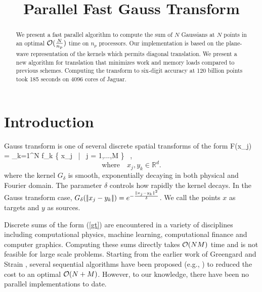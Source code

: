 \documentclass[conference]{IEEEtran}
\begin{document}
\title{Parallel Fast Gauss Transform}  


\author{

\and
{}

\and
{}
}
\date{}
\maketitle

\begin{abstract}
We present a fast parallel algorithm to compute the sum of $N$ Gaussians at $N$ points in an optimal $\mathcal{O}(\frac{N}{n_p})$ time on $n_p$ processors. Our implementation is based on the plane-wave representation of the kernels which permits diagonal translation. We present a new algorithm for translation that minimizes work and memory loads compared to previous schemes.
Computing the transform to six-digit accuracy at 120 billion points took 185 seconds on 4096 cores of Jaguar. 
\end{abstract}

\section{Introduction}  \label{s:intro}
Gauss transform is one of several discrete spatial transforms of the form 
%
\beq F(x_j) = \sum_{k=1}^N  f_k \quad {} \quad \{ x_j \, | \, j = 1,...,M \} \, , \label{gt} \eeq
\[\text{where} \quad x_j, y_k \in \mathbb{R}^d. \]
%
where the kernel $G_\delta$ is smooth, exponentially decaying in both physical and Fourier domain. The parameter $\delta$ controls how rapidly the kernel decays.  
In the Gauss transform case, $G_\delta (|\!| x_j - y_k |\!|) = e^{-\frac{\|x_j - y_k\|^2}{\delta}}$.  We call the points $x$ as targets and $y$ as sources.  

Discrete sums of the form (\ref{gt}) are encountered in a variety of disciplines including computational physics, machine learning, computational finance and computer graphics. Computing these sums directly takes $\mathcal{O}(NM)$ time and is not feasible for large scale problems. Starting from the earlier work of Greengard and Strain \cite{fgt}, several sequential algorithms have been proposed (e.g.,  \cite{greengard98, duraiswami03, fggt}) to reduced the cost to an optimal $\mathcal{O}(N+M)$. However, to our knowledge, there have been no parallel implementations to date. 
\end{document}
